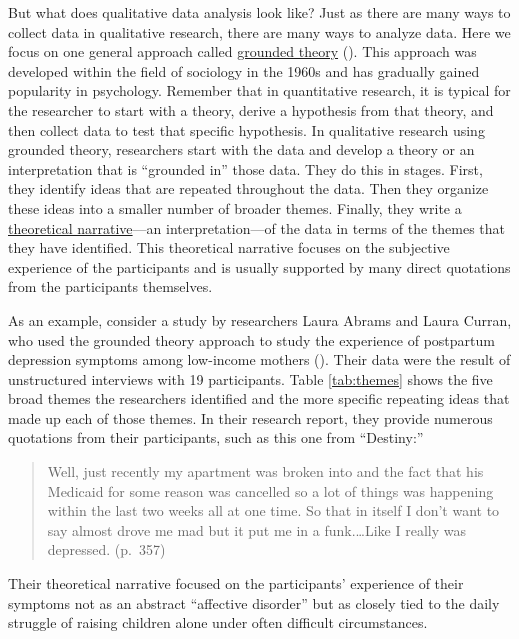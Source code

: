 \documentclass[
]{krantz}
\begin{document}
But what does qualitative data analysis look like? Just as there are many ways to collect data in qualitative research, there are many ways to analyze data. Here we focus on one general approach called \hyperref[grounded-theory]{grounded theory} (). This approach was developed within the field of sociology in the 1960s and has gradually gained popularity in psychology. Remember that in quantitative research, it is typical for the researcher to start with a theory, derive a hypothesis from that theory, and then collect data to test that specific hypothesis. In qualitative research using grounded theory, researchers start with the data and develop a theory or an interpretation that is ``grounded in'' those data. They do this in stages. First, they identify ideas that are repeated throughout the data. Then they organize these ideas into a smaller number of broader themes. Finally, they write a \hyperref[theoretical-narrative]{theoretical narrative}---an interpretation---of the data in terms of the themes that they have identified. This theoretical narrative focuses on the subjective experience of the participants and is usually supported by many direct quotations from the participants themselves.

As an example, consider a study by researchers Laura Abrams and Laura Curran, who used the grounded theory approach to study the experience of postpartum depression symptoms among low-income mothers (). Their data were the result of unstructured interviews with 19 participants. Table \ref{tab:themes} shows the five broad themes the researchers identified and the more specific repeating ideas that made up each of those themes. In their research report, they provide numerous quotations from their participants, such as this one from ``Destiny:''

\begin{quote}
Well, just recently my apartment was broken into and the fact that his Medicaid for some reason was cancelled so a lot of things was happening within the last two weeks all at one time. So that in itself I don't want to say almost drove me mad but it put me in a funk.\ldots Like I really was depressed. (p.~357)
\end{quote}

Their theoretical narrative focused on the participants' experience of their symptoms not as an abstract ``affective disorder'' but as closely tied to the daily struggle of raising children alone under often difficult circumstances.
\end{document}
